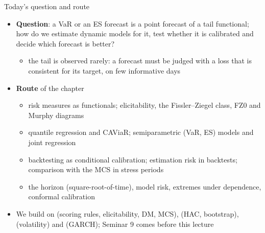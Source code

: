 \begin{frame}{Today's question and route}
\itemsize{\small}
\begin{itemize}
    \item \textbf{Question}: a VaR or an ES forecast is a point forecast of a tail functional; how do we estimate dynamic models for it, test whether it is calibrated and decide which forecast is better?
    \begin{itemize}
        \item the tail is observed rarely: a forecast must be judged with a loss that is consistent for its target, on few informative days
    \end{itemize}
    \item \textbf{Route} of the chapter
    \begin{itemize}
        \item risk measures as functionals; elicitability, the Fissler--Ziegel class, FZ0 and Murphy diagrams
        \item quantile regression and CAViaR; semiparametric (VaR, ES) models and joint regression
        \item backtesting as conditional calibration; estimation risk in backtests; comparison with the MCS in stress periods
        \item the horizon (square-root-of-time), model risk, extremes under dependence, conformal calibration
    \end{itemize}
    \item We build on  (scoring rules, elicitability, DM, MCS),  (HAC, bootstrap),  (volatility) and  (GARCH); Seminar 9 comes before this lecture
\end{itemize}
\end{frame}

